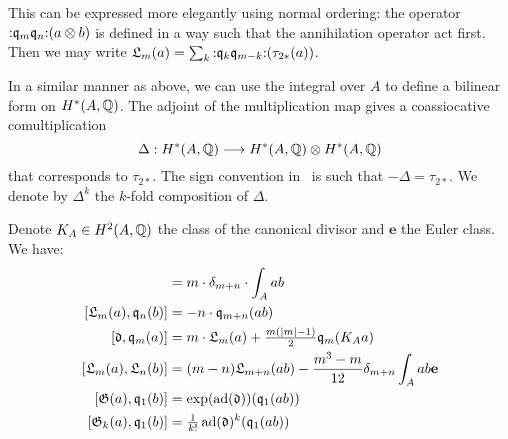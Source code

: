 \begin{remark}
This can be expressed more elegantly using normal ordering: the operator $\mathop{:}\nolimits\!\mathfrak{q}_m\mathfrak{q}_n\!\mathop{:}\nolimits(a\otimes b)$ is defined in a way such that the annihilation operator act first. Then we may write $\mathfrak{L}_m(a) = \sum_k
\mathop{:}\nolimits\! \mathfrak{q}_k \mathfrak{q}_{m-k} \!\mathop{:}\nolimits (\tau_{2*}(a))$.
\end{remark}
\begin{remark}
In a similar manner as above, we can use the integral over $A$ to define a bilinear form on $H^*(A,\mathbb{Q})$. The adjoint of the multiplication map gives a coassiocative comultiplication
$$
\Delta : H^*(A,\mathbb{Q}) \longrightarrow H^*(A,\mathbb{Q})\otimes H^*(A,\mathbb{Q})
$$
that corresponds to $\tau_{2*}$. The sign convention in~\cite{LehnSorger} is such that $-\Delta =  \tau_{2*}$. We denote by $\Delta^k$ the $k$-fold composition of $\Delta$.
\end{remark}
\begin{lemma}\cite[Thm.~2.16]{LiQinWang} Denote $K_A\in H^2(A,\mathbb{Q})$ the class of the canonical divisor and $\mathbf e$ the Euler class. We have:
\label{commutators}
\begin{align}
[\q_m(a), \q_n(b)] &= m\cdot \delta_{m+n} \cdot \int_A ab \\
\label{qLcommute}
[\mathfrak{L}_m(a),\q_n(b)] &= -n\cdot \q_{m+n}(ab) \\
\label{DiffNaka}
[\mathfrak{d},\q_m(a)] &= m \cdot \mathfrak{L}_m(a) + \tfrac{m(|m|-1)}{2} \q_m(K_A a) \\
[\mathfrak{L}_m(a),\mathfrak{L}_n(b)] &= (m-n) \mathfrak{L}_{m+n}(ab) - \frac{m^3-m}{12} \delta_{m+n}\int_A ab\mathbf e \\
[\G(a),\q_1(b)] &= \exp(\ad(\mathfrak{d}))(\q_1(a b) ) \\
[\G_k(a),\q_1(b)] &= \tfrac{1}{k!} \ad(\mathfrak{d})^k(\q_1(a b) ) 
\end{align}
\end{lemma}
